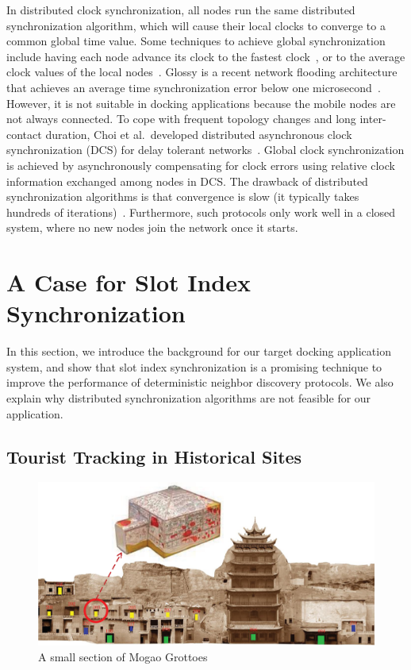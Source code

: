 \documentclass[twoside,twocolumn]{article}
\begin{document}
In distributed clock synchronization, all nodes run the same distributed synchronization algorithm, which 
will cause their local clocks to converge to a common global time value.  Some techniques to achieve global 
synchronization include having each node advance its clock to the fastest clock~\citep{jiang2004clock,zhou2007accurate}, 
or to the average clock values of the local nodes~\citep{li2006global,sommer2009gradient,sasabe2009simple}.  
Glossy is a recent network flooding architecture that achieves an average time synchronization error below 
one microsecond~\citep{ferrari11glossy}.  However, it is not suitable in docking applications because the 
mobile nodes are not always connected.  To cope with frequent topology changes and long inter-contact duration, 
Choi et al.\ developed distributed asynchronous clock synchronization (DCS) for delay tolerant networks~\citep{choi2012dcs}.  
Global clock synchronization is achieved by asynchronously compensating for clock errors using relative clock
information exchanged among nodes in DCS. The drawback of distributed synchronization algorithms is that 
convergence is slow (it typically takes hundreds of iterations)~\citep{he12random}. Furthermore, such
protocols only work well in a closed system, where no new nodes join the network once it starts.

\section{A Case for Slot Index Synchronization}
\label{sec:challenge}
In this section, we introduce the background for our target docking application system, 
and show that slot index synchronization is a promising technique to improve the 
performance of deterministic neighbor discovery protocols. We also explain why distributed
synchronization algorithms are not feasible for our application.

\subsection{Tourist Tracking in Historical Sites}

\begin{figure}[t]
  \centering 
  \includegraphics[scale=0.35]{static/mogao}
  \caption{A small section of Mogao Grottoes}
  \label{fig:mogao}
\end{figure}
\end{document}
